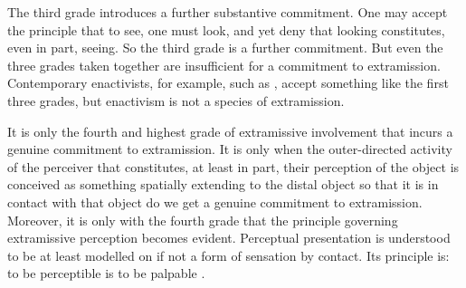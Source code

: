 \documentclass[12pt]{article}
\begin{document}
The third grade introduces a further substantive commitment. One may accept the principle that to see, one must look, and yet deny that looking constitutes, even in part, seeing. So the third grade is a further commitment. But even the three grades taken together are insufficient for a commitment to extramission. Contemporary enactivists, for example, such as \citet{Noe:2004fk}, accept something like the first three grades, but enactivism is not a species of extramission.

It is only the fourth and highest grade of extramissive involvement that incurs a genuine commitment to extramission. It is only when the outer-directed activity of the perceiver that constitutes, at least in part, their perception of the object is conceived as something spatially extending to the distal object so that it is in contact with that object do we get a genuine commitment to extramission. Moreover, it is only with the fourth grade that the principle governing extramissive perception becomes evident. Perceptual presentation is understood to be at least modelled on if not a form of sensation by contact. Its principle is: to be perceptible is to be palpable \citep[see][for discussion]{Kalderon:2015fr}.









\nocite{Tourscher:1933rw}



\end{document}
